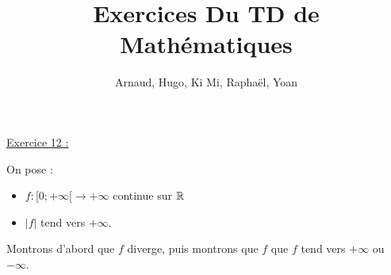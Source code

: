 \documentclass{article}
\title{Exercices Du TD de Mathématiques}
\author{Arnaud, Hugo, Ki Mi, Raphaël, Yoan}
\begin{document}
\maketitle

\bigskip
\bigskip

\underline{Exercice 12 :}

\bigskip
\bigskip

On pose :

\begin{itemize}
    \item $f:[0;+\infty[\longrightarrow+\infty$ continue sur $\mathbb{R}$
    \item $|f|$ tend vers $+\infty$.
\end{itemize}


\bigskip
\bigskip
\bigskip
\bigskip


Montrons d'abord que $f$ diverge, puis montrons que $f$ que $f$ tend vers $+\infty$ ou $-\infty$.
\end{document}
